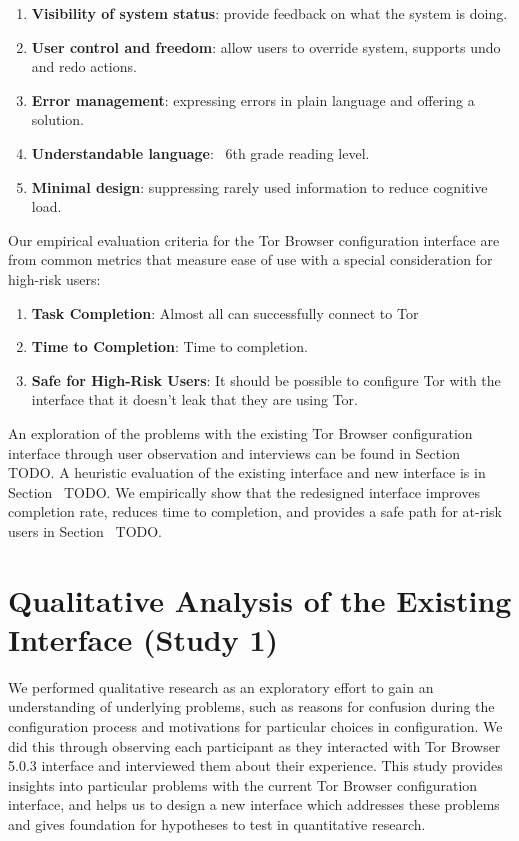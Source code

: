 \documentclass[USenglish,oneside,twocolumn]{article}
\begin{document}
\begin{enumerate}
    \item  {\bfseries Visibility of system status}: provide feedback on what the system is doing.
    \item  {\bfseries User control and freedom}: allow users to override system, supports undo and redo actions. 
    \item  {\bfseries Error management}: expressing errors in plain language and offering a solution. 
    \item  {\bfseries Understandable language}: ~6th grade reading level. 
    \item  {\bfseries Minimal design}: suppressing rarely used information to reduce cognitive load. 
\end{enumerate}

Our empirical evaluation criteria for the Tor Browser configuration
interface are from common metrics that measure ease of use with a special 
consideration for high-risk users: \\

\begin{enumerate}
    \item {\bfseries Task Completion}: Almost all can successfully connect to Tor
    \item {\bfseries  Time to Completion}: Time to completion. 
    \item {\bfseries Safe for High-Risk Users}: It should be possible to configure Tor with the interface that it doesn't leak that they are using Tor. 
\end{enumerate}

An exploration of the problems with the existing Tor Browser 
configuration interface through user observation and interviews can be 
found in Section~{\color{red} TODO}. A heuristic evaluation of the existing interface and new interface is in Section~{\color{red} TODO}. We empirically show 
that the redesigned interface improves completion rate, reduces time to completion, 
and provides a safe path for at-risk users in Section~{\color{red} TODO}. 

\section{Qualitative Analysis of the Existing Interface (Study 1)}
We performed qualitative research as an exploratory effort to gain an 
understanding of underlying problems, such as reasons for confusion 
during the configuration process and motivations for particular choices in 
configuration. We did this through observing each participant as they 
interacted with Tor Browser 5.0.3 interface and interviewed them about
their experience. This study provides insights into particular problems with 
the current Tor Browser configuration interface, and helps us to design
a new interface which addresses these problems and gives foundation
for hypotheses to test in quantitative research. 
\end{document}
